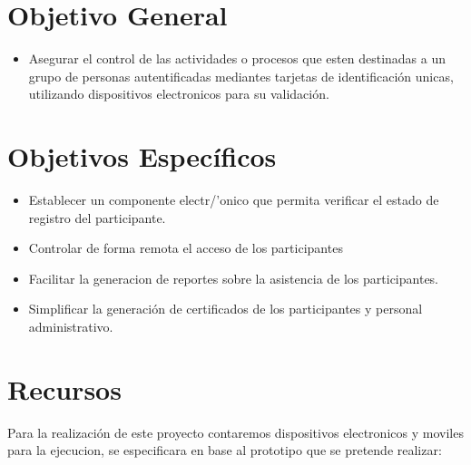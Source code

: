 \documentclass[letter,12pt]{article}
\begin{document}
\section{Objetivo General}
	\begin{itemize}
		\item Asegurar el control de las actividades o procesos que esten destinadas a un grupo de personas autentificadas mediantes tarjetas de identificaci\'on unicas, utilizando dispositivos electronicos para su validaci\'on.
	\end{itemize}

\section{Objetivos Espec\'ificos}
	\begin{itemize}
	
		\item Establecer un componente electr/'onico que permita verificar el estado de registro del participante.
		\item Controlar de forma remota el acceso de los participantes
		\item Facilitar la generacion de reportes sobre la asistencia de los participantes.
		\item Simplificar la generaci\'on de certificados de los participantes y personal administrativo. 
	\end{itemize}

\section{Recursos}

Para la realizaci\'on de este proyecto contaremos dispositivos electronicos y moviles para la ejecucion, se especificara en base al prototipo que se pretende realizar:\\

\pagebreak
\end{document}
